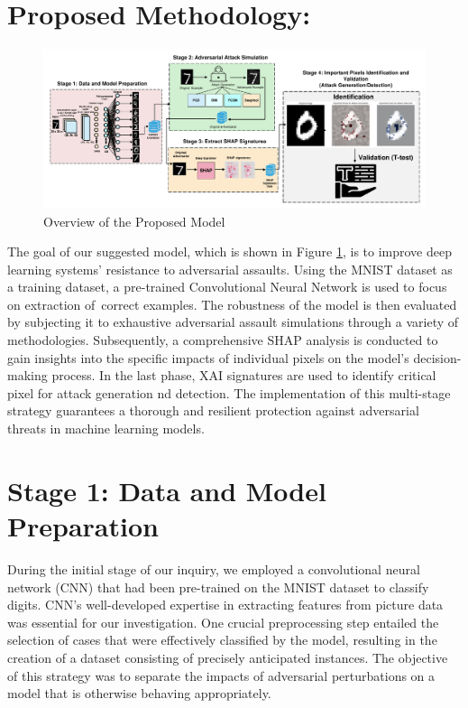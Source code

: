 \documentclass[10pt, conference, a4paper, final]{IEEEtran}
\begin{document}
\section{Proposed Methodology:}

\begin{figure}[!ht]
    \centering
    \includegraphics[width=1\textwidth]{paper_images/papermodel_v2.pdf}
    \caption{Overview of the Proposed Model}
    \label{overview}
\end{figure}
   
The goal of our suggested model, which is shown in Figure \ref {overview}, is to improve deep learning systems' resistance to adversarial assaults. Using the MNIST dataset as a training dataset, a pre-trained Convolutional Neural Network is used to focus on extraction of correct examples. The robustness of the model is then evaluated by subjecting it to exhaustive adversarial assault simulations through a variety of methodologies. Subsequently, a comprehensive SHAP analysis is conducted to gain insights into the specific impacts of individual pixels on the model's decision-making process. In the last phase, XAI signatures are used to identify critical pixel for attack generation nd detection. The implementation of this multi-stage strategy guarantees a thorough and resilient protection against adversarial threats in machine learning models.


\section{Stage 1: Data and Model Preparation}

During the initial stage of our inquiry, we employed a convolutional neural network (CNN) that had been pre-trained on the MNIST dataset to classify digits. CNN's well-developed expertise in extracting features from picture data was essential for our investigation. One crucial preprocessing step entailed the selection of cases that were effectively classified by the model, resulting in the creation of a dataset consisting of precisely anticipated instances. The objective of this strategy was to separate the impacts of adversarial perturbations on a model that is otherwise behaving appropriately.
\end{document}
